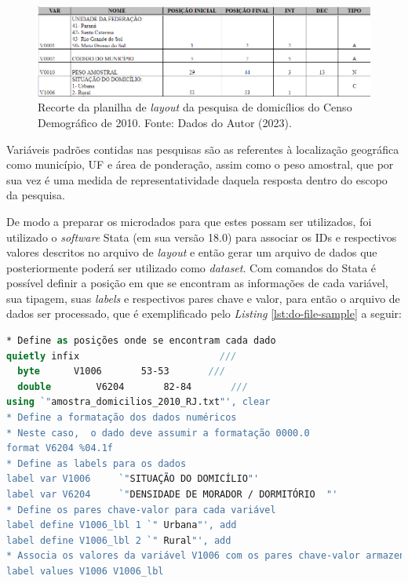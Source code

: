 \begin{figure}[h]
    \centering
    \includegraphics[width=\textwidth]{files/img/layout amostra domicilios 2010.png}
    \caption{Recorte da planilha de \textit{layout} da pesquisa de domicílios do Censo Demográfico de 2010. Fonte: Dados do Autor (2023).}
    \label{fig:layout-domi}
\end{figure}

    Variáveis padrões contidas nas pesquisas são as referentes à localização geográfica como município, UF e área de ponderação, assim como o peso amostral, que por sua vez é uma medida de representatividade daquela resposta dentro do escopo da pesquisa.

    De modo a preparar os microdados para que estes possam ser utilizados, foi utilizado o \textit{software} Stata (em sua versão 18.0) para associar os IDs e respectivos valores descritos no arquivo de \textit{layout} e então gerar um arquivo de dados que posteriormente poderá ser utilizado como \textit{dataset}. 
    Com comandos do Stata é possível definir a posição em que se encontram as informações de cada variável, sua tipagem, suas \textit{labels} e respectivos pares chave e valor, para então o arquivo de dados ser processado, que é exemplificado pelo \textit{Listing} \ref{lst:do-file-sample} a seguir:

\bigskip
\begin{lstlisting}[float = h, label={lst:do-file-sample},language=Stata, caption=Exemplo de comandos Stata utilizados para``traduzir'' os microdados.]
* Define as posições onde se encontram cada dado
quietly infix                         ///
  byte		V1006		53-53		///
  double		V6204		82-84		///
using `"amostra_domicilios_2010_RJ.txt"', clear
* Define a formatação dos dados numéricos
* Neste caso,  o dado deve assumir a formatação 0000.0
format V6204 %04.1f
* Define as labels para os dados
label var V1006		`"SITUAÇÃO DO DOMICÍLIO"'
label var V6204		`"DENSIDADE DE MORADOR / DORMITÓRIO  "'
* Define os pares chave-valor para cada variável
label define V1006_lbl 1 `" Urbana"', add
label define V1006_lbl 2 `" Rural"', add
* Associa os valores da variável V1006 com os pares chave-valor armazenados em V1006_lbl
label values V1006 V1006_lbl
\end{lstlisting}

